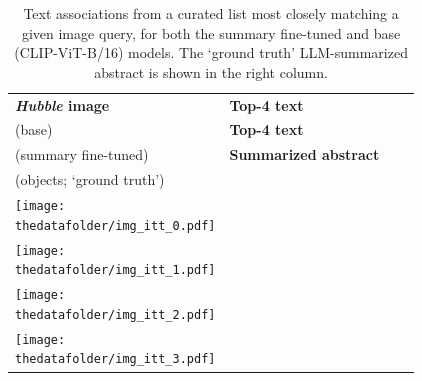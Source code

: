 \documentclass[10pt]{article} %
\newcommand{\hubble}{\emph{Hubble}\xspace}
\begin{document}
\begin{table}[h!]
  \centering
  \renewcommand{\arraystretch}{0.1}
  \begin{tabular}{m{3cm} m{3.2cm} m{3.2cm} m{5cm}}
      \toprule
      \centering \bfseries \hubble image & \centering \textbf{Top-4 text} \\ {\textcolor{deeppurple}{(base)}} & \centering  \textbf{Top-4 text} \\ {\textcolor{deepred}{(summary fine-tuned)}} & \centering \textbf{Summarized abstract} \\ (objects; `ground truth') \tabularnewline
      \midrule
      \centering \texttt{[image: \\thedatafolder/img\_itt\_0.pdf]} & \centering \scriptsize  & \centering  \scriptsize  &  {\scriptsize } \tabularnewline
      \midrule
      \centering \texttt{[image: \\thedatafolder/img\_itt\_1.pdf]} & \centering \scriptsize  & \centering  \scriptsize  &  {\scriptsize } \tabularnewline
      \midrule
      \centering \texttt{[image: \\thedatafolder/img\_itt\_2.pdf]} & \centering \scriptsize  & \centering  \scriptsize  &  {\scriptsize } \tabularnewline
      \midrule
      \centering \texttt{[image: \\thedatafolder/img\_itt\_3.pdf]} & \centering \scriptsize  & \centering  \scriptsize  &  {\scriptsize } \tabularnewline
      \bottomrule
  \end{tabular}
  \caption{Text associations from a curated list most closely matching a given image query, for both the \textcolor{deepred}{summary fine-tuned} and \textcolor{deeppurple}{base} (CLIP-ViT-B/16) models. The `ground truth' LLM-summarized abstract is shown in the right column.}
  \label{tab:itt}
\end{table}
\end{document}
